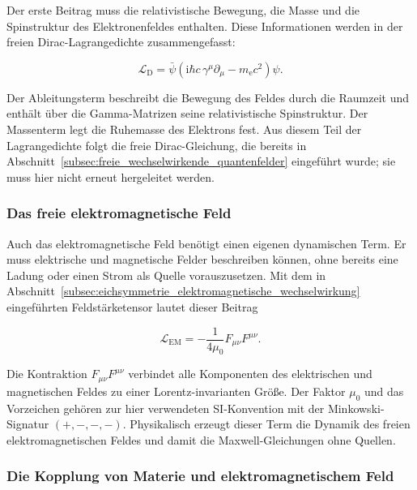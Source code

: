 Der erste Beitrag muss die relativistische Bewegung, die Masse und die
Spinstruktur des Elektronenfeldes enthalten. Diese Informationen werden
in der freien Dirac-Lagrangedichte zusammengefasst:

\begin{equation}
	\mathcal L_{\mathrm D}
	=
	\bar{\psi}
	\left(
	\mathrm{i}\hbar c\,\gamma^\mu\partial_\mu
	-
	m_{\mathrm e}c^2
	\right)
	\psi.
	\label{eq:lagrangedichte_freies_diracfeld_qed}
\end{equation}

Der Ableitungsterm beschreibt die Bewegung des Feldes durch die
Raumzeit und enthält über die Gamma-Matrizen seine relativistische
Spinstruktur. Der Massenterm legt die Ruhemasse des Elektrons fest. Aus
diesem Teil der Lagrangedichte folgt die freie Dirac-Gleichung, die
bereits in Abschnitt~\ref{subsec:freie_wechselwirkende_quantenfelder}
eingeführt wurde; sie muss hier nicht erneut hergeleitet werden.

\subsubsection*{Das freie elektromagnetische Feld}

Auch das elektromagnetische Feld benötigt einen eigenen dynamischen
Term. Er muss elektrische und magnetische Felder beschreiben können,
ohne bereits eine Ladung oder einen Strom als Quelle vorauszusetzen.
Mit dem in Abschnitt~\ref{subsec:eichsymmetrie_elektromagnetische_wechselwirkung}
eingeführten Feldstärketensor lautet dieser Beitrag

\begin{equation}
	\mathcal L_{\mathrm{EM}}
	=
	-
	\frac{1}{4\mu_0}
	F_{\mu\nu}F^{\mu\nu}.
	\label{eq:lagrangedichte_freies_em_feld_qed}
\end{equation}

Die Kontraktion \(F_{\mu\nu}F^{\mu\nu}\) verbindet alle Komponenten des
elektrischen und magnetischen Feldes zu einer Lorentz-invarianten
Größe. Der Faktor \(\mu_0\) und das Vorzeichen gehören zur hier
verwendeten SI-Konvention mit der Minkowski-Signatur \((+,-,-,-)\).
Physikalisch erzeugt dieser Term die Dynamik des freien
elektromagnetischen Feldes und damit die Maxwell-Gleichungen ohne
Quellen.

\subsubsection*{Die Kopplung von Materie und elektromagnetischem Feld}


